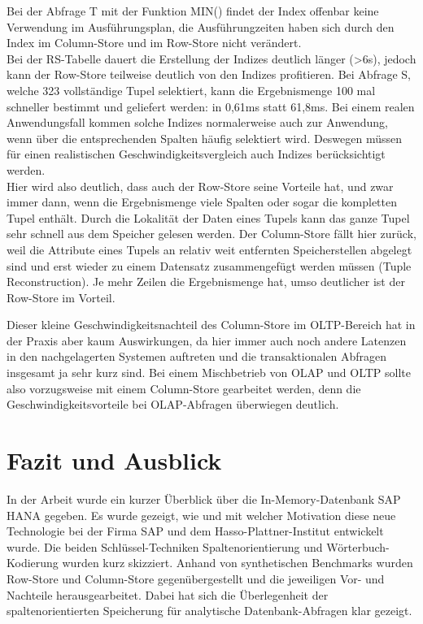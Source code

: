 Bei der Abfrage T mit der Funktion MIN() findet der Index offenbar keine 
Verwendung im Ausführungsplan, die Ausführungzeiten haben sich durch den
Index im Column-Store und im Row-Store nicht verändert.\\
Bei der RS-Tabelle dauert die Erstellung der Indizes deutlich länger (>6s), 
jedoch kann der Row-Store teilweise deutlich von den Indizes profitieren.
Bei Abfrage S, welche 323 vollständige Tupel selektiert, kann 
die Ergebnismenge 100 mal schneller bestimmt und geliefert werden: in 0,61ms statt 61,8ms.
Bei einem realen Anwendungsfall kommen solche Indizes normalerweise auch zur
Anwendung, wenn über die entsprechenden Spalten häufig selektiert wird. 
Deswegen müssen für einen realistischen Geschwindigkeitsvergleich auch 
Indizes berücksichtigt werden.\\
Hier wird also deutlich, dass auch der Row-Store seine Vorteile hat, und zwar
immer dann, wenn die Ergebnismenge viele Spalten oder sogar die kompletten
Tupel enthält. Durch die Lokalität der Daten eines Tupels kann das ganze Tupel
sehr schnell aus dem Speicher gelesen werden. 
Der Column-Store fällt hier zurück, weil die Attribute eines Tupels an relativ 
weit entfernten Speicherstellen abgelegt sind und erst wieder zu einem Datensatz
zusammengefügt werden müssen (Tuple Reconstruction).
Je mehr Zeilen die Ergebnismenge hat, umso deutlicher ist der Row-Store im Vorteil.

Dieser kleine Geschwindigkeitsnachteil des Column-Store im OLTP-Bereich hat in
der Praxis aber kaum Auswirkungen, da hier immer auch noch andere Latenzen in 
den nachgelagerten Systemen auftreten und die transaktionalen Abfragen insgesamt
ja sehr kurz sind. Bei einem Mischbetrieb von OLAP und OLTP sollte also vorzugsweise
mit einem Column-Store gearbeitet werden, denn die Geschwindigkeitsvorteile bei
OLAP-Abfragen überwiegen deutlich.

\section{Fazit und Ausblick}
In der Arbeit wurde ein kurzer Überblick über die In-Memory-Datenbank SAP HANA gegeben.
Es wurde gezeigt, wie und mit welcher Motivation diese neue Technologie bei der 
Firma SAP und dem Hasso-Plattner-Institut entwickelt wurde.
Die beiden Schlüssel-Techniken Spaltenorientierung und Wörterbuch-Kodierung wurden kurz skizziert.
Anhand von synthetischen Benchmarks wurden Row-Store und Column-Store gegenübergestellt
und die jeweiligen Vor- und Nachteile herausgearbeitet. Dabei hat sich die Überlegenheit der
spaltenorientierten Speicherung für analytische Datenbank-Abfragen klar gezeigt.

